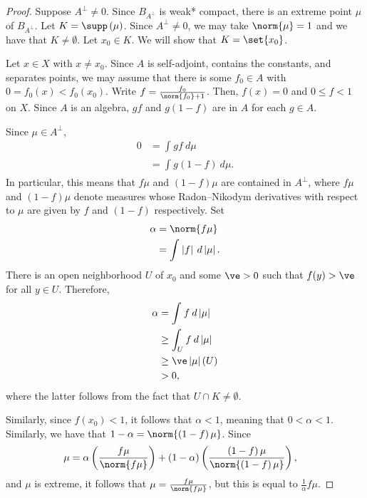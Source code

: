\documentclass[10pt]{mypackage}
\begin{document}
\begin{proof}
  Suppose $A^{\perp}\neq 0$. Since $B_{A^{\perp}}$ is weak* compact, there is an extreme point $\mu$ of $B_{A^{\perp}}$. Let $K = \supp\left( \mu \right)$. Since $A^{\perp}\neq 0$, we may take $\norm{\mu} = 1$ and we have that $K\neq \emptyset$. Let $x_0\in K$. We will show that $K = \set{x_0}$.

  Let $x\in X$ with $x\neq x_0$. Since $A$ is self-adjoint, contains the constants, and separates points, we may assume that there is some $f_0\in A$ with $0 = f_0\left( x \right) < f_0\left( x_0 \right)$. Write $f = \frac{f_0}{\norm{f_0} + 1}$. Then, $f\left( x \right) = 0$ and $0 \leq f < 1$ on $X$. Since $A$ is an algebra, $gf$ and $g\left( 1-f \right)$ are in $A$ for each $g\in A$.

  Since $\mu\in A^{\perp}$,
  \begin{align*}
    0 &= \int_{}^{} gf\:d\mu\\
      &= \int_{}^{} g\left( 1-f \right)\:d\mu.
  \end{align*}
  In particular, this means that $f\mu$ and $\left( 1-f \right)\mu$ are contained in $A^{\perp}$, where $f\mu$ and $\left( 1-f \right)\mu$ denote measures whose Radon--Nikodym derivatives with respect to $\mu$ are given by $f$ and $\left( 1-f \right)$ respectively. Set
  \begin{align*}
    \alpha &= \norm{f\mu}\\
           &= \int_{}^{} \left\vert f \right\vert\:d\left\vert \mu \right\vert.
  \end{align*}
  There is an open neighborhood $U$ of $x_0$ and some $\ve > 0$ such that $f(y) > \ve$ for all $y\in U$. Therefore,
  \begin{align*}
    \alpha &= \int_{}^{} f\:d\left\vert \mu \right\vert\\
           &\geq \int_{U}^{} f\:d\left\vert \mu \right\vert\\
           &\geq \ve \left\vert \mu \right\vert\left( U \right)\\
           &> 0,
  \end{align*}
  where the latter follows from the fact that $U\cap K\neq \emptyset$.

  Similarly, since $f\left( x_0 \right) < 1$, it follows that $\alpha < 1$, meaning that $0 < \alpha < 1$. Similarly, we have that $1-\alpha = \norm{\left( 1-f \right)\mu}$. Since
  \begin{align*}
    \mu &= \alpha \left( \frac{f\mu}{\norm{f\mu}} \right) + \left( 1-\alpha \right)\left( \frac{\left( 1-f \right)\mu}{\norm{\left( 1-f \right)\mu}} \right),
  \end{align*}
  and $\mu$ is extreme, it follows that $\mu = \frac{f\mu}{\norm{f\mu}}$, but this is equal to $\frac{1}{\alpha}f\mu$.


\end{proof}
\end{document}

